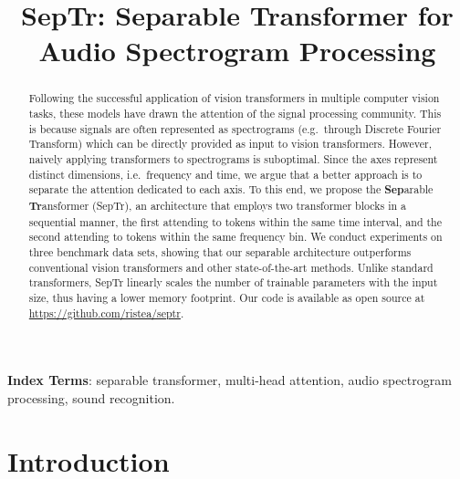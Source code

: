 \documentclass[a4paper]{article}
\title{SepTr: Separable Transformer for Audio Spectrogram Processing}
\begin{document}
\maketitle


\begin{abstract}
Following the successful application of vision transformers in multiple computer vision tasks, these models have drawn the attention of the signal processing community. This is because signals are often represented as spectrograms (e.g.~through Discrete Fourier Transform) which can be directly provided as input to vision transformers. However, naively applying transformers to spectrograms is suboptimal. Since the axes represent distinct dimensions, i.e.~frequency and time, we argue that a better approach is to separate the attention dedicated to each axis. To this end, we propose the \textbf{Sep}arable \textbf{Tr}ansformer (SepTr), an architecture that employs two transformer blocks in a sequential manner, the first attending to tokens within the same time interval, and the second attending to tokens within the same frequency bin. We conduct experiments on three benchmark data sets, showing that our separable architecture outperforms conventional vision transformers and other state-of-the-art methods. Unlike standard transformers, SepTr linearly scales the number of trainable parameters with the input size, thus having a lower memory footprint. Our code is available as open source at \url{https://github.com/ristea/septr}.
\end{abstract}
\noindent\textbf{Index Terms}: separable transformer, multi-head attention, audio spectrogram processing, sound recognition.

\setlength{\abovedisplayskip}{3pt}
\setlength{\belowdisplayskip}{3pt}

\vspace{-0.1cm}
\section{Introduction}
\end{document}
